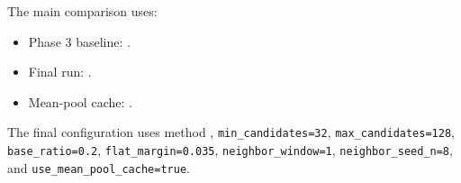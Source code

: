 \documentclass[11pt]{article}
\begin{document}
\begin{sloppypar}
\small
The main comparison uses:
\begin{itemize}
    \item Phase 3 baseline: .
    \item Final run: .
    \item Mean-pool cache: .
\end{itemize}

The final configuration uses method , \texttt{min\_candidates=32}, \texttt{max\_candidates=128}, \texttt{base\_ratio=0.2}, \texttt{flat\_margin=0.035}, \texttt{neighbor\_window=1}, \texttt{neighbor\_seed\_n=8}, and \texttt{use\_mean\_pool\_cache=true}.
\end{sloppypar}
\end{document}
